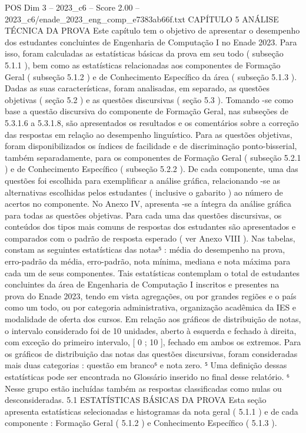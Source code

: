 \begin{textsample}{POS Dim 3 – 2023\_c6 – Score 2.00 – 2023\_c6/enade\_2023\_eng\_comp\_e7383ab66f.txt}  \label{ex:f3_pos_105}
CAPÍTULO 5 ANÁLISE TÉCNICA DA PROVA Este capítulo tem o objetivo de apresentar o desempenho dos estudantes concluintes de Engenharia de Computação I no Enade 2023.
Para isso, foram calculadas as estatísticas básicas da prova em seu todo ( subseção 5.1.1 ), bem como as estatísticas relacionadas aos componentes de Formação Geral ( subseção 5.1.2 ) e de Conhecimento Específico da área ( subseção 5.1.3 ).
Dadas as suas características, foram analisadas, em separado, as questões objetivas ( seção 5.2 ) e as questões discursivas ( seção 5.3 ).
Tomando -se como base a questão discursiva do componente de Formação Geral, nas subseções de 5.3.1.6 a 5.3.1.8, são apresentados os resultados e os comentários sobre a correção das respostas em relação ao desempenho linguístico.
Para as questões objetivas, foram disponibilizados os índices de facilidade e de discriminação ponto-bisserial, também separadamente, para os componentes de Formação Geral ( subseção 5.2.1 ) e de Conhecimento Específico ( subseção 5.2.2 ).
De cada componente, uma das questões foi escolhida para exemplificar a análise gráfica, relacionando -se as alternativas escolhidas pelos estudantes ( inclusive o gabarito ) ao número de acertos no componente.
No Anexo IV, apresenta -se a íntegra da análise gráfica para todas as questões objetivas.
Para cada uma das questões discursivas, os conteúdos dos tipos mais comuns de respostas dos estudantes são apresentados e comparados com o padrão de resposta esperado ( ver Anexo VIII ).
Nas tabelas, constam as seguintes estatísticas das notas⁵ : média do desempenho na prova, erro-padrão da média, erro-padrão, nota mínima, mediana e nota máxima para cada um de seus componentes.
Tais estatísticas contemplam o total de estudantes concluintes da área de Engenharia de Computação I inscritos e presentes na prova do Enade 2023, tendo em vista agregações, ou por grandes regiões e o país como um todo, ou por categoria administrativa, organização acadêmica da IES e modalidade de oferta dos cursos.
Em relação aos gráficos de distribuição de notas, o intervalo considerado foi de 10 unidades, aberto à esquerda e fechado à direita, com exceção do primeiro intervalo, [ 0 ; 10 ], fechado em ambos os extremos.
Para os gráficos de distribuição das notas das questões discursivas, foram consideradas mais duas categorias : questão em branco⁶ e nota zero. ⁵ Uma definição dessas estatísticas pode ser encontrada no Glossário inserido no final desse relatório. ⁶ Nesse grupo estão incluídas também as respostas classificadas como nulas ou desconsideradas. 5.1 ESTATÍSTICAS BÁSICAS DA PROVA Esta seção apresenta estatísticas selecionadas e histogramas da nota geral ( 5.1.1 ) e de cada componente : Formação Geral ( 5.1.2 ) e Conhecimento Específico ( 5.1.3 ).

\end{textsample}
